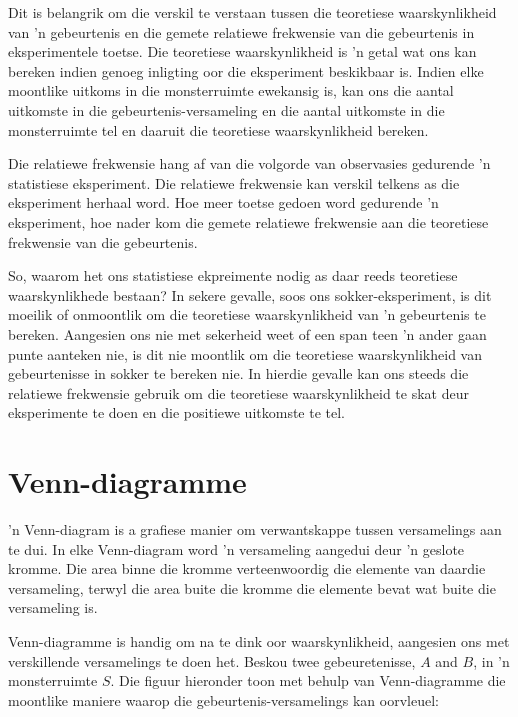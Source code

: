 Dit is belangrik om die verskil te verstaan tussen die teoretiese waarskynlikheid van 'n gebeurtenis en die gemete relatiewe frekwensie van die gebeurtenis in eksperimentele toetse. Die teoretiese waarskynlikheid is 'n getal wat ons kan bereken indien genoeg inligting oor die eksperiment beskikbaar is. Indien elke moontlike uitkoms in die monsterruimte ewekansig is, kan ons die aantal uitkomste in die gebeurtenis-versameling en die aantal uitkomste in die monsterruimte tel en daaruit die teoretiese waarskynlikheid bereken.\par

Die relatiewe frekwensie hang af van die volgorde van observasies gedurende 'n statistiese eksperiment. Die relatiewe frekwensie kan verskil telkens as die eksperiment herhaal word. Hoe meer toetse gedoen word gedurende 'n eksperiment, hoe nader kom die gemete relatiewe frekwensie aan die teoretiese frekwensie van die gebeurtenis.\par

So, waarom het ons statistiese ekpreimente nodig as daar reeds teoretiese waarskynlikhede bestaan? In sekere gevalle, soos ons sokker-eksperiment, is dit moeilik of onmoontlik om die teoretiese waarskynlikheid van 'n gebeurtenis te bereken. Aangesien ons nie met sekerheid weet of een span teen 'n ander gaan punte aanteken nie, is dit nie moontlik om die teoretiese waarskynlikheid van gebeurtenisse in sokker te bereken nie. In hierdie gevalle kan ons steeds die relatiewe frekwensie gebruik om die teoretiese waarskynlikheid te skat deur eksperimente te doen en die positiewe uitkomste te tel.

\section{Venn-diagramme}
'n Venn-diagram is a grafiese manier om verwantskappe tussen versamelings aan te dui. In elke Venn-diagram word 'n versameling aangedui deur 'n geslote kromme. Die area binne die kromme verteenwoordig die elemente van daardie versameling, terwyl die area buite die kromme die elemente bevat wat buite die versameling is.
\par


Venn-diagramme is handig om na te dink oor waarskynlikheid, aangesien ons met verskillende versamelings te doen het. Beskou twee gebeuretenisse, $A$ and $B$, in 'n monsterruimte $S$. Die figuur hieronder toon met behulp van Venn-diagramme die moontlike maniere waarop die gebeurtenis-versamelings kan oorvleuel:


